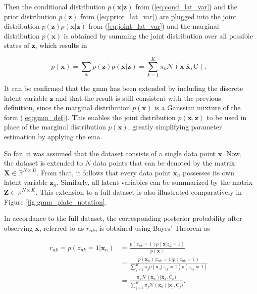 \documentclass[../../../main.tex]{subfiles}
\begin{document}
Then the conditional distribution $p(\bm{x}|\bm{z})$ from (\ref{eq:cond_lat_var}) and the prior distribution $p(\bm{z})$ from (\ref{eq:prior_lat_var}) are plugged into the joint distribution $p(\bm{z})p(\bm{x}|\bm{z})$ from (\ref{eq:joint_lat_var}) and the marginal distribution $p(\bm{x})$ is obtained by summing the joint distribution over all possible states of $\bm{z}$, which results in 

\begin{equation}\label{eq:joint_marg_lat_var}
    p(\bm{x}) = \sum\limits_{\bm{z}}p(\bm{z})p(\bm{x}|\bm{z}) = \sum\limits_{k=1}^K\pi_k\mathcal{N}(\bm{x} | \overline{\bm{x}}, \bm{\mathrm{C}}).
\end{equation}

It can be confirmed that the \acrshort{gmm} has been extended by including the discrete latent variable  $\bm{z}$ and that the result is still consistent with the previous definition, since the marginal distribution $p(\bm{x})$ is a Gaussian mixture of the form (\ref{eq:gmm_def}). This enables the joint distribution $p(\bm{x}, \bm{z})$ to be used in place of the marginal distribution $p(\bm{x})$, greatly simplifying parameter estimation by applying the \acrshort{ema}.

So far, it was assumed that the dataset consists of a single data point $\bm{x}$. Now, the dataset is extended to $N$ data points that can be denoted by the matrix $\bm{X} \in \mathbb{R}^{N \times D}$. From that, it follows that every data point $\bm{x}_n$ possesses its own latent variable $\bm{z}_n$. Similarly, all latent variables can be summarized by the matrix $\bm{Z} \in \mathbb{R}^{N \times K}$. This extension to a full dataset is also illustrated comparatively in Figure \ref{fig:gmm_plate_notation}.

In accordance to the full dataset, the corresponding posterior probability after observing $\bm{x}$, referred to as $r_{nk}$, is obtained using Bayes' Theorem as

\begin{equation}\label{eq:responsibilities}
    \begin{aligned}
        r_{nk}=p(z_{nk}=1|\bm{x}_n) &= \frac{p(z_{nk}=1)p(\bm{x} | z_k=1)}{p(\bm{x})}\\[5pt]
        &= \frac{p(\bm{x}_n) | z_{nk}=1)p(z_{nk}=1)}{\sum_{j=1}^K\pi_j p(\bm{x}_n | z_{nj}=1)p(z_{nj}=1)} \\[5pt]
        &= \frac{\pi_k\mathcal{N}(\bm{x}_n) | \overline{\bm{x}}_k, \bm{\mathrm{C}}_k)}{\sum_{j=1}^K\pi_j\mathcal{N}(\bm{x}_n) | \overline{\bm{x}}_j, \bm{\mathrm{C}}_j)}.
    \end{aligned}
\end{equation}
\end{document}

